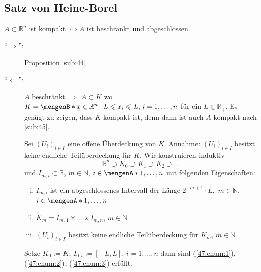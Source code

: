 \subsection{Satz von Heine-Borel} %
\label{sub:47}
$A \subset \mathds{R}^n$ ist kompakt $\iff A $ ist beschränkt und abgeschlossen.
\begin{description}
	\item[\enquote{$\Rightarrow$}:] Proposition \ref{sub:44}
	\item[\enquote{$\Leftarrow$}:] $A$ beschränkt $\Rightarrow $ $A \subset K$ wo $K = \set[\underline{x} \in \mathds{R}^n]{- L \le x_i \le L,\, i=1,\ldots ,n} $ 
	für ein $L \in \mathds{R}_+$. Es genügt zu zeigen, dass $K$ kompakt ist, denn dann ist auch $A$ kompakt nach \ref{sub:45}.
	
	Sei $(U_i)_{i \in I}$ eine offene Überdeckung von $K$. Annahme: $(U_i)_{i \in I}$ besitzt keine endliche Teilüberdeckung für $K$. Wir konstruieren induktiv
	\[
		\mathds{R}^n \supset K_0 \supset K_1 \supset K_2 \supset \ldots 
	\]
	und $I_{m,i} \subset \mathds{R}$, $m \in \mathds{N}$, $i \in \set{1, \ldots ,n} $ mit folgenden Eigenschaften:
	\begin{enumerate}[(i)]
		\item \label{47:enum:1} $I_{m,i}$ ist ein abgeschlossenes Intervall der Länge $2^{-m+1} \cdot L$, $\, m \in \mathds{N}$, $i \in  \set{1, \ldots ,n} $
		\item \label{47:enum:2} $K_m = I_{m,1} \times \ldots \times I_{m,n}$, $m \in \mathds{N}$
		\item \label{47:enum:3}$(U_i)_{i \in I}$ besitzt keine endliche Teilüberdeckung für $K_m$, $m \in \mathds{N}$
	\end{enumerate}
	\begin{figure}[ht]
	\end{figure}
	Setze $K_0 := K $, $I_{0,i} := [-L,L]$, $i=1,\ldots ,n$ dann sind (\ref{47:enum:1}), (\ref{47:enum:2}), (\ref{47:enum:3}) erfüllt.
	

\end{description}
